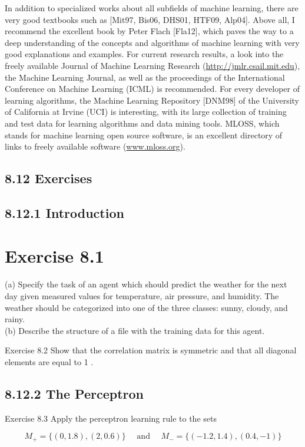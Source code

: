 \documentclass[10pt]{article}
\begin{document}
In addition to specialized works about all subfields of machine learning, there are very good textbooks such as [Mit97, Bis06, DHS01, HTF09, Alp04]. Above all, I recommend the excellent book by Peter Flach [Fla12], which paves the way to a deep understanding of the concepts and algorithms of machine learning with very good explanations and examples. For current research results, a look into the freely available Journal of Machine Learning Research (\href{http://jmlr.csail.mit.edu}{http://jmlr.csail.mit.edu}), the Machine Learning Journal, as well as the proceedings of the International Conference on Machine Learning (ICML) is recommended. For every developer of learning algorithms, the Machine Learning Repository [DNM98] of the University of California at Irvine (UCI) is interesting, with its large collection of training and test data for learning algorithms and data mining tools. MLOSS, which stands for machine learning open source software, is an excellent directory of links to freely available software (\href{http://www.mloss.org}{www.mloss.org}).

\subsection*{8.12 Exercises}
\subsection*{8.12.1 Introduction}
\section*{Exercise 8.1}
(a) Specify the task of an agent which should predict the weather for the next day given measured values for temperature, air pressure, and humidity. The weather should be categorized into one of the three classes: sunny, cloudy, and rainy.\\
(b) Describe the structure of a file with the training data for this agent.

Exercise 8.2 Show that the correlation matrix is symmetric and that all diagonal elements are equal to 1 .

\subsection*{8.12.2 The Perceptron}
Exercise 8.3 Apply the perceptron learning rule to the sets

$$
M_{+}=\{(0,1.8),(2,0.6)\} \quad \text { and } \quad M_{-}=\{(-1.2,1.4),(0.4,-1)\}
$$
\end{document}

